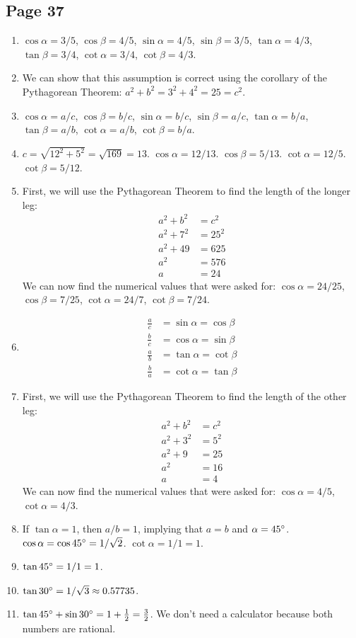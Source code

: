 \documentclass{article}
\newenvironment{solutions}[1]
{\subsection*{#1}
 \begin{enumerate}[leftmargin=1.5em]}
{\end{enumerate}}
\newcommand{\solution}{\item}
\begin{document}
\begin{solutions}{Page 37}
\solution %
$\cos{\alpha}=3/5$, $\cos{\beta}=4/5$, $\sin{\alpha}=4/5$, $\sin{\beta}=3/5$, $\tan{\alpha}=4/3$, $\tan{\beta}=3/4$, $\cot{\alpha}=3/4$, $\cot{\beta}=4/3$.

\solution %
We can show that this assumption is correct using the corollary of the Pythagorean Theorem:
$a^2 + b^{2} = 3^{2} + 4^{2} = 25 = c^2$.

\solution %
$\cos{\alpha}=a/c$, $\cos{\beta}=b/c$, $\sin{\alpha}=b/c$, $\sin{\beta}=a/c$, $\tan{\alpha}=b/a$, $\tan{\beta}=a/b$, $\cot{\alpha}=a/b$, $\cot{\beta}=b/a$.

\solution %
$c = \sqrt{12^2 + 5^2} = \sqrt{169} = 13$. $\cos{\alpha}=12/13$. $\cos{\beta}=5/13$. $\cot{\alpha}=12/5$. $\cot{\beta}=5/12$.

\solution %
First, we will use the Pythagorean Theorem to find the length of the longer leg:
\begin{align*}
a^2 + b^2 &= c^2\\
a^2 + 7^2 &= 25^2\\
a^2 + 49 &= 625\\
a^2 &= 576\\
a &= 24
\end{align*}
We can now find the numerical values that were asked for: $\cos{\alpha}=24/25$, $\cos{\beta}=7/25$, $\cot{\alpha}=24/7$, $\cot{\beta}=7/24$.

\solution %
\begin{align*}
\frac{a}{c} &= \sin{\alpha} = \cos{\beta}\\
\frac{b}{c} &= \cos{\alpha} = \sin{\beta}\\
\frac{a}{b} &= \tan{\alpha} = \cot{\beta}\\
\frac{b}{a} &= \cot{\alpha} = \tan{\beta}
\end{align*}

\solution %
First, we will use the Pythagorean Theorem to find the length of the other leg:
\begin{align*}
a^2 + b^2 &= c^2\\
a^2 + 3^2 &= 5^2\\
a^2 + 9 &= 25\\
a^2 &= 16\\
a &= 4
\end{align*}
We can now find the numerical values that were asked for: $\cos{\alpha}=4/5$, $\cot{\alpha}=4/3$.

\solution %
If $\tan{\alpha} = 1$, then $a/b=1$, implying that $a = b$ and $\alpha = 45\degree$. $\cos{\alpha} = \cos{45\degree} = 1/\sqrt{2}$. $\cot{\alpha} = 1/1 = 1$. 

\solution %
$\tan{45\degree} = 1/1 = 1$.

\solution %
$\tan{30\degree} = 1/\sqrt{3} \approx 0.57735$.

\solution %
$\tan{45\degree} + \sin{30\degree} = 1 + \frac{1}{2} = \frac{3}{2}$. We don't need a calculator because both numbers are rational.

\end{solutions}
\end{document}
